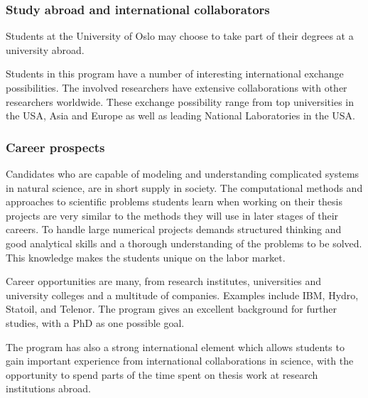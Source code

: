 \documentclass{beamer}
\begin{document}
\begin{frame}
\frametitle{Study abroad and international collaborators}

\begin{block}{}

Students at the University of Oslo may choose to take part of
their degrees at a university abroad.

Students in this program have a number of interesting international
exchange possibilities. The involved researchers have extensive
collaborations with other researchers worldwide. These exchange
possibility range from top universities in the USA, Asia and Europe as
well as leading National Laboratories in the USA.  
\end{block}
\end{frame}

\begin{frame}
\frametitle{Career prospects}

\begin{block}{}
Candidates who are capable of modeling and understanding complicated
systems in natural science, are in short supply in society.  The
computational methods and approaches to scientific problems students learn
when working on their thesis projects are very similar to the methods
they will use in later stages of their careers.  To handle large
numerical projects demands structured thinking and good analytical
skills and a thorough understanding of the problems to be solved. This
knowledge makes the students unique on the labor market.

Career opportunities are many, from research institutes, universities
and university colleges and a multitude of companies. Examples
include IBM, Hydro, Statoil, and Telenor.  The program gives an
excellent background for further studies, with a PhD as one possible
goal.

The program has also a strong international element which allows students to
gain important experience from international collaborations in
science, with the opportunity to spend parts of the time spent on 
thesis work at research institutions abroad.
\end{block}
\end{frame}
\end{document}
